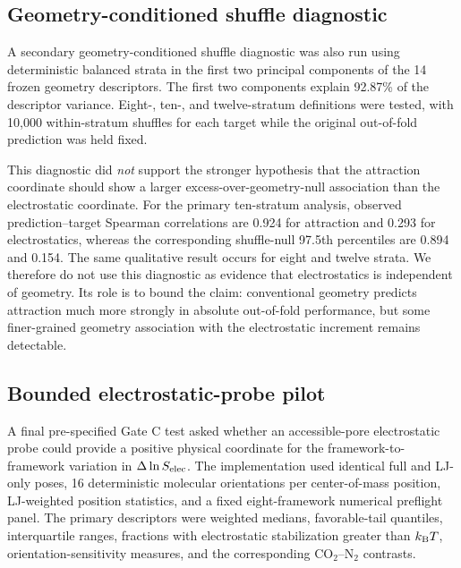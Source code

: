 \documentclass[11pt,a4paper]{article}
\begin{document}
\subsection{Geometry-conditioned shuffle diagnostic}

A secondary geometry-conditioned shuffle diagnostic was also run using deterministic balanced strata in the first two principal components of the 14 frozen geometry descriptors. The first two components explain 92.87\% of the descriptor variance. Eight-, ten-, and twelve-stratum definitions were tested, with 10,000 within-stratum shuffles for each target while the original out-of-fold prediction was held fixed.

This diagnostic did \emph{not} support the stronger hypothesis that the attraction coordinate should show a larger excess-over-geometry-null association than the electrostatic coordinate. For the primary ten-stratum analysis, observed prediction--target Spearman correlations are 0.924 for attraction and 0.293 for electrostatics, whereas the corresponding shuffle-null 97.5th percentiles are 0.894 and 0.154. The same qualitative result occurs for eight and twelve strata. We therefore do not use this diagnostic as evidence that electrostatics is independent of geometry. Its role is to bound the claim: conventional geometry predicts attraction much more strongly in absolute out-of-fold performance, but some finer-grained geometry association with the electrostatic increment remains detectable.

\subsection{Bounded electrostatic-probe pilot}

A final pre-specified Gate C test asked whether an accessible-pore electrostatic probe could provide a positive physical coordinate for the framework-to-framework variation in $\Delta\ln S_{\rm elec}$. The implementation used identical full and LJ-only poses, 16 deterministic molecular orientations per center-of-mass position, LJ-weighted position statistics, and a fixed eight-framework numerical preflight panel. The primary descriptors were weighted medians, favorable-tail quantiles, interquartile ranges, fractions with electrostatic stabilization greater than $k_{\rm B}T$, orientation-sensitivity measures, and the corresponding CO$_2$--N$_2$ contrasts.
\end{document}
